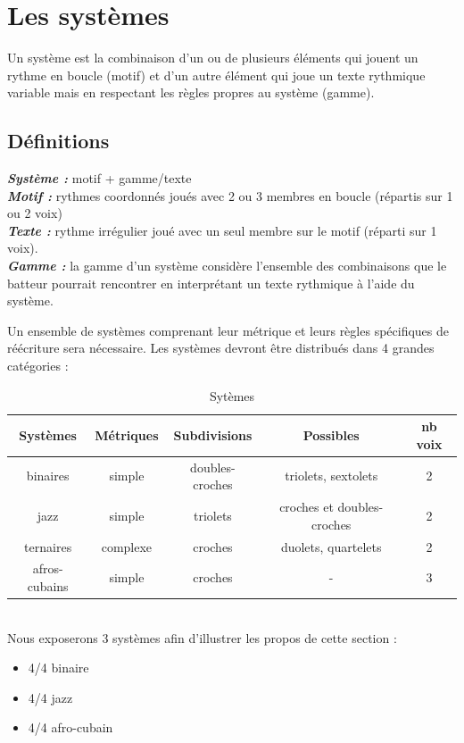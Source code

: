 \section{Les systèmes}
\label{systemes_methodes}
Un système est la combinaison d’un ou de plusieurs éléments qui jouent un rythme en boucle (motif) et d’un autre élément qui joue un texte rythmique variable mais en respectant les règles propres au système (gamme).

\subsection*{Définitions}

\textit{\textbf{Système :}} motif + gamme/texte\\
\textit{\textbf{Motif :}} rythmes coordonnés joués avec 2 ou 3 membres en boucle (répartis sur 1 ou 2 voix)\\
\textit{\textbf{Texte :}} rythme irrégulier joué avec un seul membre sur le motif (réparti sur 1 voix).\\
\textit{\textbf{Gamme :}} la gamme d’un système considère l’ensemble des combinaisons que le batteur pourrait rencontrer en interprétant un texte rythmique à l’aide du système.

Un ensemble de systèmes comprenant leur métrique et leurs règles spécifiques de réécriture sera nécessaire. 
Les systèmes devront être distribués dans 4 grandes catégories :
\begin{table}[h]
	\centering
	\begin{tabular}{|c|c|c|c|c|} \hline
		Systèmes & Métriques & Subdivisions & Possibles & nb voix \\ \hline
		binaires & simple & doubles-croches & triolets, sextolets & 2 \\
		jazz & simple & triolets & croches et doubles-croches & 2 \\
		ternaires & complexe & croches & duolets, quartelets & 2 \\
		afros-cubains & simple & croches & - & 3 \\ \hline
	\end{tabular}
	\caption{Sytèmes}
\end{table}\\
Nous exposerons 3 systèmes afin d’illustrer les propos de cette section :
\begin{itemize}
	\item 4/4 binaire 
	\item 4/4 jazz
	\item 4/4 afro-cubain
\end{itemize}
